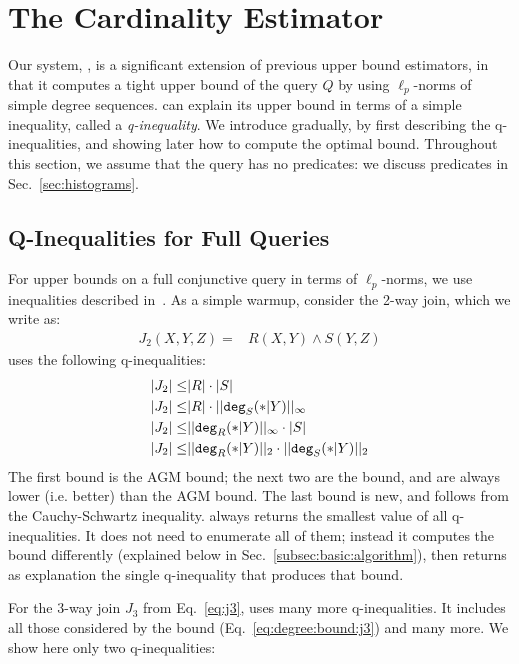 \section{The \system Cardinality Estimator}
\label{sec:lpbound}

Our system, \system, is a significant extension of previous upper
bound estimators, in that it computes a tight upper bound of the query $Q$ by
using $\ell_p$-norms of simple degree sequences.  \system can explain
its upper bound in terms of a simple inequality, called a
\emph{q-inequality}.  We introduce \system gradually, by first
describing the q-inequalities, and showing later how to compute the
optimal bound.  Throughout this section, we assume that the query has
no predicates: we discuss predicates in Sec.~\ref{sec:histograms}.

\subsection{Q-Inequalities for Full Queries}

\label{subsec:lpbound:full}

For upper bounds on a full conjunctive query in terms of
$\ell_p$-norms, we use inequalities described
in~\cite{DBLP:journals/pacmmod/KhamisNOS24}.  As a simple warmup,
consider the 2-way join, which we write as:
%
\begin{align}
  J_2(X,Y,Z) = & R(X,Y) \wedge S(Y,Z) \label{eq:j2}
\end{align}
%
\system uses the following q-inequalities:
%
\begin{align}
  |J_2| \leq & |R|\cdot|S| \\
  |J_2| \leq & |R|\cdot ||\texttt{deg}_S(*|Y)||_\infty \\
  |J_2| \leq & ||\texttt{deg}_R(*|Y)||_\infty \cdot |S| \\
  |J_2| \leq & ||\texttt{deg}_R(*|Y)||_2 \cdot ||\texttt{deg}_S(*|Y)||_2
\end{align}
%
The first bound is the AGM bound; the next two are the \maxdegree
bound, and are always lower (i.e. better) than the AGM bound.  The
last bound is new, and follows from the Cauchy-Schwartz inequality.
\system always returns the smallest value of all q-inequalities.  It
does not need to enumerate all of them; instead it computes the bound
differently (explained below in Sec.~\ref{subsec:basic:algorithm}),
then returns as explanation the single q-inequality that produces that
bound.

For the 3-way join $J_3$ from Eq.~\eqref{eq:j3}, \system uses many more q-inequalities.  It
includes all those considered by the \maxdegree bound
(Eq.~\eqref{eq:degree:bound:j3}) and many more.  We show here only two
q-inequalities:

